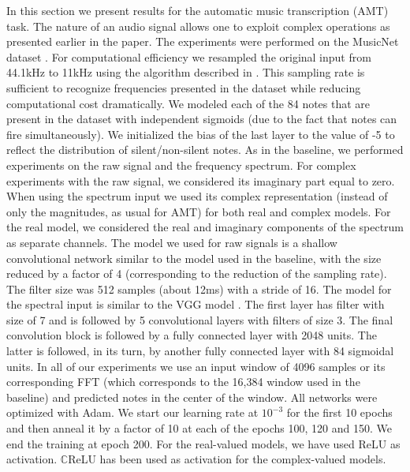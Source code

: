 \documentclass{article}
\begin{document}
In this section we present results for the automatic music transcription (AMT) task. The nature of an audio signal allows one to exploit complex operations as presented earlier in the paper.
The experiments were performed on the MusicNet dataset \citep{thickstun2016learning}. For computational efficiency we resampled the original input from 44.1kHz to 11kHz using the algorithm described in \cite{smith2002digital}. This sampling rate is sufficient to 
recognize frequencies presented in the dataset while reducing computational cost dramatically. We modeled each of the 84 notes that are present in the dataset with independent sigmoids (due to the fact that notes can fire simultaneously). We initialized the bias of the last layer to the value of -5 to reflect the distribution of silent/non-silent notes. As in the baseline, we performed experiments on the raw signal and the frequency spectrum. For complex experiments with the raw signal, we considered its imaginary part equal to zero. When using the spectrum input we used its complex representation (instead of only the magnitudes, as usual for AMT) for both real and complex models. For the real model, we considered the real and imaginary components of the spectrum as separate channels.
The model we used for raw signals is a shallow convolutional network similar to the model used in the baseline, with the size reduced by a factor of 4 (corresponding to the reduction of the sampling rate). The filter size was 512 samples (about 12ms) with a stride of 16. The model for the spectral input is similar to the VGG model \citep{Simonyan14}. The first layer has filter with size of 7 and is followed by 5 convolutional layers with filters of size 3. The final convolution block is followed by a fully connected layer with 2048 units. The latter is followed, in its turn, by another fully connected layer with 84 sigmoidal units. In all of our experiments we use an input window of 4096 samples or its corresponding FFT (which corresponds to the 16,384 window used in the baseline) and predicted notes in the center of the window. All networks were optimized with Adam. We start our learning rate at $10^{-3}$ for the first 10 epochs and then anneal it by a factor of 10 at each of the epochs 100, 120 and 150. We end the training at epoch 200. For the real-valued models, we have used ReLU as activation. $\mathbb{C}$ReLU has been used as activation for the complex-valued models.
\end{document}
